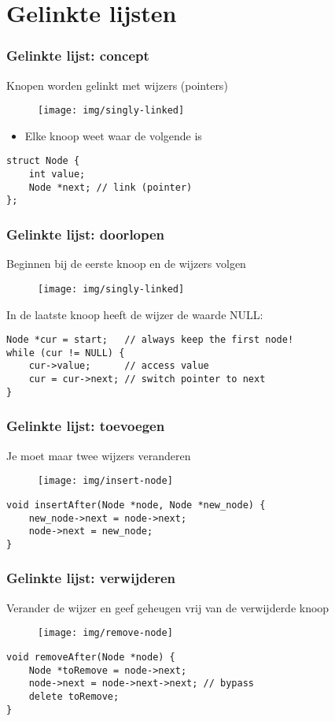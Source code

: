 \documentclass[12pt]{beamer}
\begin{document}
\section{Gelinkte lijsten}

\begin{frame}[fragile]
\frametitle{Gelinkte lijst: concept}
Knopen worden gelinkt met wijzers (pointers)
\begin{figure}
\centering
\texttt{[image: img/singly-linked]}
\end{figure}
\begin{itemize}
\item Elke knoop weet waar de volgende is
\end{itemize}
\begin{lstlisting}
struct Node {
    int value;
    Node *next; // link (pointer)
};
\end{lstlisting}
\end{frame}

\begin{frame}[fragile]
\frametitle{Gelinkte lijst: doorlopen}
Beginnen bij de eerste knoop en de wijzers volgen
\begin{figure}
\centering
\texttt{[image: img/singly-linked]}
\end{figure}
In de laatste knoop heeft de wijzer de waarde NULL:
\begin{lstlisting}
Node *cur = start;   // always keep the first node!
while (cur != NULL) {
    cur->value;      // access value
    cur = cur->next; // switch pointer to next
}
\end{lstlisting}
\end{frame}

\begin{frame}[fragile]
\frametitle{Gelinkte lijst: toevoegen}
Je moet maar twee wijzers veranderen
\begin{figure}
\centering
\texttt{[image: img/insert-node]}
\end{figure}
\begin{lstlisting}
void insertAfter(Node *node, Node *new_node) {
    new_node->next = node->next;
    node->next = new_node;
}
\end{lstlisting}
\end{frame}

\begin{frame}[fragile]
\frametitle{Gelinkte lijst: verwijderen}
Verander de wijzer en geef geheugen vrij van de verwijderde knoop
\begin{figure}
\centering
\texttt{[image: img/remove-node]}
\end{figure}
\begin{lstlisting}
void removeAfter(Node *node) {
    Node *toRemove = node->next;
    node->next = node->next->next; // bypass
    delete toRemove;
}
\end{lstlisting}
\end{frame}
\end{document}

